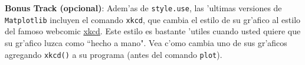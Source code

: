 \documentclass[11pt]{exam}
\begin{document}
\begin{questions}
\item \textbf{Bonus Track (opcional)}: Adem'as de \texttt{style.use}, las 'ultimas versiones de \texttt{Matplotlib} incluyen el comando \texttt{xkcd}, que cambia el estilo de su gr'afico al estilo del famoso webcomic \href{http://xkcd.com/}{xkcd}. Este estilo es bastante 'utiles cuando usted quiere que su gr'afico luzca como ``hecho a mano". Vea c'omo cambia uno de sus gr'aficos agregando \texttt{xkcd()} a su programa (antes del comando \texttt{plot}).
\end{questions}
\end{document}
